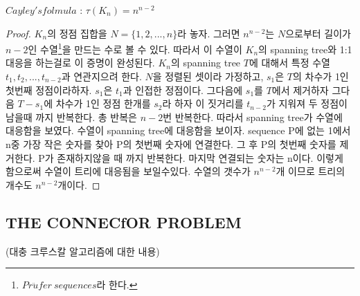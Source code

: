 \begin{theorem}
    $Cayley's folmula$ : $\tau(K_n)= n^{n-2}$
\end{theorem}

\begin{proof}
    $K_n$의 정점 집합을 $N = \{1,2, ...,n\}$라 놓자.
    그러면 $n^{n-2}$는  $N$으로부터 길이가 $n-2$인 수열\footnote{$Pr\ddot{u}fer \: sequences$라 한다.}을 만드는 수로 볼 수 있다.
    따라서 이 수열이 $K_n$의 spanning tree와 1:1대응을 하는걸로 이 증명이 완성된다.
    $K_n$의 spanning tree $T$에 대해서 특정 수열 ${t_1, t_2, ... , t_{n-2}}$과 연관지으려 한다.
    $N$을 정렬된 셋이라 가정하고, $s_1$은 $T$의 차수가 1인 첫번째 정점이라하자. $s_1$은 $t_1$과 인접한 정점이다.
    그다음에 $s_1$를 $T$에서 제거하자 그다음 $T-s_1$에 차수가 1인 정점 한개를 $s_2$라 하자 이 짓거리를 $t_{n-2}$가 지워져 두 정점이 남을때 까지 반복한다. 총 반복은 $n-2$번 반복한다. 따라서 spanning tree가 수열에 대응함을 보였다.
    수열이 spanning tree에 대응함을 보이자.
    sequence P에 없는 1에서 n중 가장 작은 숫자를 찾아 P의 첫번째 숫자에 연결한다.
    그 후 P의 첫번째 숫자를 제거한다.
    P가 존재하지않을 때 까지 반복한다. 마지막 연결되는 숫자는 n이다.
    이렇게 함으로써 수열이 트리에 대응됨을 보일수있다.
    수열의 갯수가 $n^{n-2}$개 이므로 트리의 개수도 $n^{n-2}$개이다.
\end{proof}

\subsection{THE CONNECfOR PROBLEM}
(대충 크루스칼 알고리즘에 대한 내용)